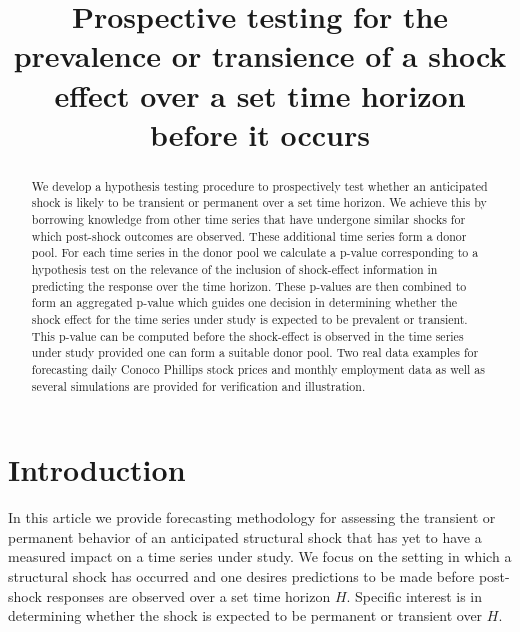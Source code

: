 \documentclass[11pt]{article}
\title{Prospective testing for the prevalence or transience of a shock effect over a set time horizon before it occurs}
\author{}
\date{}
\theoremstyle{definition}
\begin{document}
\maketitle


\begin{abstract}
We develop a hypothesis testing procedure to prospectively test whether an anticipated shock is likely to be transient or permanent over a set time horizon. We achieve this by borrowing knowledge from other time series that have undergone similar shocks for which post-shock outcomes are observed. These additional time series form a donor pool. 
For each time series in the donor pool we calculate a p-value corresponding to a hypothesis test on the relevance of the inclusion of shock-effect information in predicting the response over the time horizon.
These p-values are then combined to form an aggregated p-value which guides one decision in determining whether the shock effect for the time series under study is expected to be prevalent or transient. This p-value can be computed before the shock-effect is observed in the time series under study provided one can form a suitable donor pool. Two real data examples for forecasting daily Conoco Phillips stock prices and monthly employment data as well as several simulations are provided for verification and illustration.
\end{abstract}


\section{Introduction}

In this article we provide forecasting methodology for assessing the transient or permanent behavior of an anticipated structural shock that has yet to have a measured impact on a time series under study. We focus on the setting in which a structural shock has occurred and one desires predictions to be made before post-shock responses are observed over a set time horizon $H$. Specific interest is in determining whether the shock is expected to be permanent or transient over $H$. 
\end{document}
